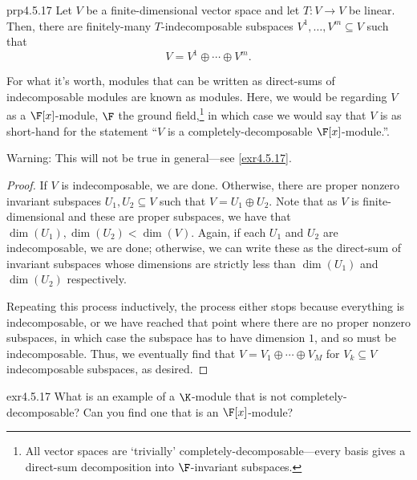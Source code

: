 \begin{prp}{}{prp4.5.17}
	Let $V$ be a finite-dimensional vector space and let $T\colon V\rightarrow V$ be linear.  Then, there are finitely-many $T$-indecomposable subspaces $V^1,\ldots ,V^m\subseteq V$ such that
	\begin{equation}
		V=V^1\oplus \cdots \oplus V^m.
	\end{equation}
	\begin{rmk}
		For what it's worth, modules that can be written as direct-sums of indecomposable modules are known as  modules.  Here, we would be regarding $V$ as a $\F [x]$-module, $\F$ the ground field,\footnote{All vector spaces are `trivially' completely-decomposable---every basis gives a direct-sum decomposition into $\F$-invariant subspaces.} in which case we would say that $V$ is  as short-hand for the statement ``$V$ is a completely-decomposable $\F [x]$-module.''.
	\end{rmk}
	\begin{rmk}
		Warning:  This will not be true in general---see \cref{exr4.5.17}.
	\end{rmk}
	\begin{proof}
		If $V$ is indecomposable, we are done.  Otherwise, there are proper nonzero invariant subspaces $U_1,U_2\subseteq V$ such that $V=U_1\oplus U_2$.  Note that as $V$ is finite-dimensional and these are proper subspaces, we have that $\dim (U_1),\dim (U_2)<\dim (V)$.  Again, if each $U_1$ and $U_2$ are indecomposable, we are done; otherwise, we can write these as the direct-sum of invariant subspaces whose dimensions are strictly less than $\dim (U_1)$ and $\dim (U_2)$ respectively.
		
		Repeating this process inductively, the process either stops because everything is indecomposable, or we have reached that point where there are no proper nonzero subspaces, in which case the subspace has to have dimension $1$, and so must be indecomposable.  Thus, we eventually find that $V=V_1\oplus \cdots \oplus V_M$ for $V_k\subseteq V$ indecomposable subspaces, as desired.
	\end{proof}
\end{prp}
\begin{exr}{}{exr4.5.17}
	What is an example of a $\K$-module that is not completely-decomposable?  Can you find one that is an $\F [x]$-module?
\end{exr}

